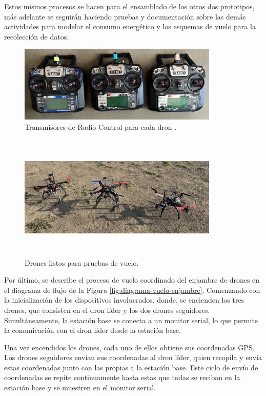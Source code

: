 \noindent Estos mismos procesos se hacen para el ensamblado de los otros dos prototipos, más adelante se seguirán haciendo pruebas y documentación sobre las demás actividades para modelar el consumo energético y los esquemas de vuelo para la recolección de datos.
\begin{figure}[H]
    \centering
    \includegraphics[width=0.85\textwidth]{imagenes/controles.png}
    \caption{Transmisores de Radio Control para cada dron .}
    \label{fig:drones}
\end{figure}
\begin{figure}[H]
    \centering
    \includegraphics[width=0.85\textwidth, height=6cm]{imagenes/tres-drones.jpg}
    \caption{Drones listos para pruebas de vuelo.}
    \label{fig:drones}
\end{figure}

\noindent Por último, se describe el proceso de vuelo coordinado del enjambre de drones en el diagrama de flujo de la Figura \ref{fig:diagrama-vuelo-enjambre}. Comenzando con la inicialización de los dispositivos involucrados, donde, se encienden los tres drones, que consisten en el dron líder y los dos drones seguidores. Simultáneamente, la estación base se conecta a un monitor serial, lo que permite la comunicación con el dron líder desde la estación base.

\noindent Una vez encendidos los drones, cada uno de ellos obtiene sus coordenadas GPS. Los drones seguidores envían sus coordenadas al dron líder, quien recopila y envía estas coordenadas junto con las propias a la estación base. Este ciclo de envío de coordenadas se repite continuamente hasta estas que todas se reciban en la estación base y se muestren en el monitor serial.

